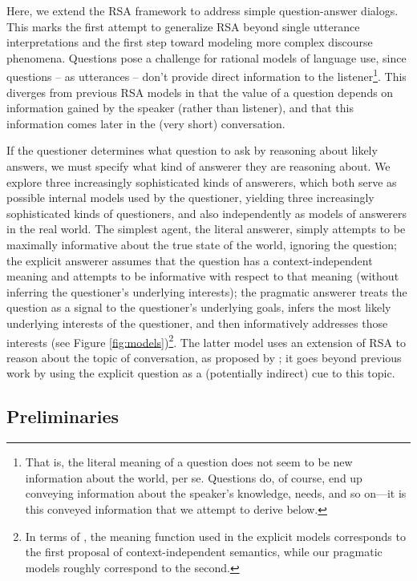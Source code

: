 \documentclass[12pt, floatsintext, jou]{apa6}
\begin{document}
Here, we extend the RSA framework to address simple question-answer dialogs. This marks the first attempt to generalize RSA beyond single utterance interpretations and the first step toward modeling more complex discourse phenomena.
Questions pose a challenge for rational models of language use, since questions -- as utterances -- don't provide direct information to the listener\footnote{That is, the literal meaning of a question does not seem to be new information about the world, per se. Questions do, of course, end up conveying information about the speaker's knowledge, needs, and so on---it is this conveyed information that we attempt to derive below.}. This diverges from previous RSA models in that the value of a question depends on information gained by the speaker (rather than listener), and that this information comes later in the (very short) conversation. 

If the questioner determines what question to ask by reasoning about likely answers, we must specify what kind of answerer they are reasoning about. We explore three increasingly sophisticated kinds of answerers, which both serve as possible internal models used by the questioner, yielding three increasingly sophisticated kinds of questioners, and also independently as models of answerers in the real world. 
The simplest agent, the literal answerer, simply attempts to be maximally informative about the true state of the world, ignoring the question;   
the explicit answerer assumes that the question has a context-independent meaning and attempts to be informative with respect to that meaning (without inferring the questioner's underlying interests);  
the pragmatic answerer treats the question as a signal to the questioner's underlying goals, infers the most likely underlying interests of the questioner, and then informatively addresses those interests (see Figure \ref{fig:models})\footnote{In terms of , the meaning function used in the explicit models corresponds to the first proposal of context-independent semantics, while our pragmatic models roughly correspond to the second.}. 
The latter model uses an extension of RSA to reason about the topic of conversation, as proposed by ; it goes beyond previous work by using the explicit question as a (potentially indirect) cue to this topic. 

\label{sec:model}

\subsection{Preliminaries}
\end{document}
